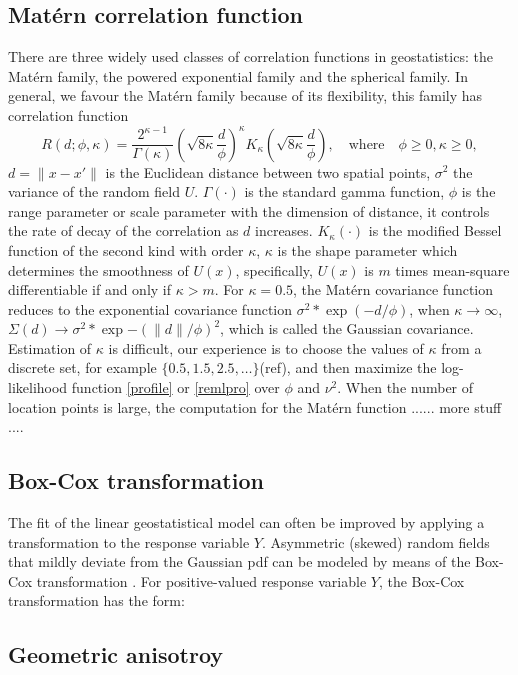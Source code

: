 \documentclass{article}\usepackage[]{graphicx}\usepackage[]{color}
\begin{document}
\subsection{Mat\'ern correlation function}
There are three widely used classes of correlation functions in geostatistics: the Mat\'ern family, the powered exponential family and the spherical family. In general, we favour the Mat\'ern family because of its flexibility, this family has correlation function
\begin{equation*}
R(d;\phi,\kappa)=\frac{2^{\kappa-1}}{\Gamma(\kappa)} (\sqrt{8\kappa} \frac{d}{\phi})^\kappa  K_\kappa(\sqrt{8\kappa}  \frac{d}{\phi}),  \quad \text{where} \quad \phi    \geq 0,  \kappa     \geq 0,
\end{equation*} 
$d =\|x-x'\|$ is the Euclidean distance between two spatial points, 
$\sigma^2$ the variance of the random field $U$. $\Gamma(\cdot)$ is the standard gamma function,  $\phi$ is the range parameter or scale parameter with the dimension of distance, it controls the rate of decay of the correlation as $d$ increases. $K_\kappa(\cdot)$ is the modified Bessel function of the second kind with order $\kappa$, $\kappa$ is the shape parameter which determines the smoothness of $U(x)$, specifically, $U(x)$ is $m$ times mean-square differentiable if and only if $\kappa > m$. For $\kappa=0.5$, the Mat\'ern covariance function reduces to the exponential covariance function $\sigma^2*\exp(-d/\phi)$, when $\kappa \rightarrow \infty$, $\Sigma(d) \rightarrow \sigma^2*\exp{-(\|d\|/\phi)^2}$, which is called the Gaussian covariance. Estimation of $\kappa$ is difficult, our experience is to choose the values of $\kappa$ from a discrete set, for example $\{0.5,1.5,2.5,\dots \}$(ref), and then maximize the log-likelihood function \eqref{profile} or \eqref{remlpro} over $\phi$ and $\nu^2$. When the number of location points is large, the computation for the Mat\'ern function ...... more stuff ....


\subsection{Box-Cox transformation}
The fit of the linear geostatistical model can often be improved by applying a transformation to the response variable $Y$. Asymmetric (skewed) random fields that mildly deviate from the Gaussian pdf can be modeled by means of the Box-Cox transformation \citep{box1964analysis}.
For positive-valued response variable $Y$, the Box-Cox transformation has the form:


\subsection{Geometric anisotroy}
\end{document}
